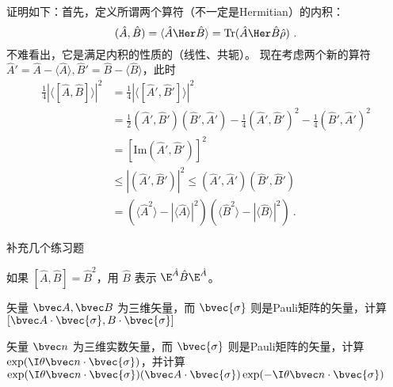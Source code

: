 证明如下：首先，定义所谓两个算符（不一定是Hermitian）的内积：
\begin{equation}
(\hat A, \hat B)=\langle\hat A\Her\hat B\rangle = \text{Tr}(\hat A\Her\hat B\hat\rho)~.
\end{equation}
不难看出，它是满足内积的性质的（线性、共轭）。
现在考虑两个新的算符 $\hat A'=\hat A-\langle\hat A\rangle, \hat B'=\hat B-\langle\hat B\rangle$，此时
\begin{equation}
\begin{split}
\frac{1}{4}|\langle[\hat A,\hat B]\rangle|^2&=\frac{1}{4}|\langle[\hat A',\hat B']\rangle|^2 \\
&=\frac{1}{2}(\hat A',\hat B')(\hat B',\hat A')-\frac{1}{4}(\hat A',\hat B')^2-\frac{1}{4}(\hat B',\hat A')^2\\
&=[\text{Im}(\hat A',\hat B')]^2\\
&\le |(\hat A',\hat B')|^2\le(\hat A',\hat A')(\hat B',\hat B')\\
&=(\langle\hat A^2\rangle - |\langle\hat A\rangle|^2)(\langle\hat B^2\rangle - |\langle\hat B\rangle|^2)~.
\end{split}
\end{equation}

补充几个练习题

\begin{exercise}{}
如果 $[\hat A,\hat B]=\hat B^2$，用 $\hat B$ 表示 $\E^{\hat A}\hat B \E^{\hat A}$。
\end{exercise}

\begin{exercise}{}
矢量 $\bvec A, \bvec B$ 为三维矢量，而 $\bvec{\sigma}$ 则是Pauli矩阵的矢量，计算 $[\bvec A\cdot\bvec{\sigma}, B\cdot\bvec{\sigma}]$
\end{exercise}

\begin{exercise}{}
矢量 $\bvec n$ 为三维实数矢量，而 $\bvec{\sigma}$ 则是Pauli矩阵的矢量，计算 $\exp(\I\theta\bvec n\cdot\bvec{\sigma})$，并计算 $\exp(\I\theta\bvec n\cdot\bvec{\sigma})(\bvec A\cdot\bvec{\sigma})\exp(-\I\theta\bvec n\cdot\bvec{\sigma})$
\end{exercise}